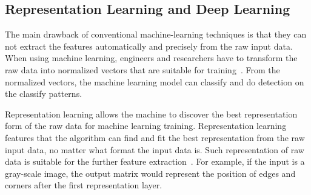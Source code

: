 \begin{spacing}{1.5}
\subsection{Representation Learning and Deep Learning}

The main drawback of conventional machine-learning techniques is that they can not extract the features automatically and precisely from the raw input data. When using machine learning, engineers and researchers have to transform the raw data into normalized vectors that are suitable for training~\cite{ongsulee2017artificial}. From the normalized vectors, the machine learning model can classify and do detection on the classify patterns.

Representation learning allows the machine to discover the best representation form of the raw data for machine learning training. Representation learning features that the algorithm can find and fit the best representation from the raw input data, no matter what format the input data is. Such representation of raw data is suitable for the further feature extraction~\cite{bengio2013representation}. For example, if the input is a gray-scale image, the output matrix would represent the position of edges and corners after the first representation layer.


\end{spacing}
